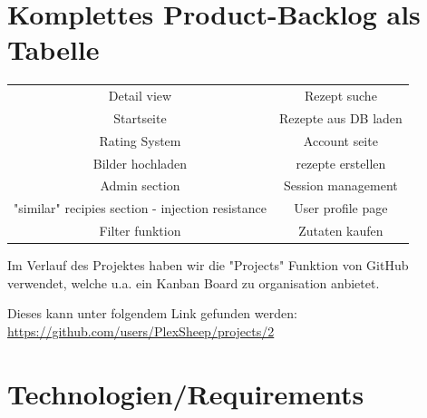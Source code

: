\documentclass{article}
\begin{document}
\pagebreak
\section{Komplettes Product-Backlog als Tabelle}
\begin{multicols}{2}
\centering
\begin{tabular}{|c|c|}
    Detail view & Rezept suche \\
    Startseite & Rezepte aus DB laden\\
    Rating System & Account seite\\
    Bilder hochladen & rezepte erstellen\\
    Admin section & Session management \\
    "similar" recipies section - injection resistance & User profile page\\
    Filter funktion & Zutaten kaufen\\
\end{tabular}
\end{multicols}

Im Verlauf des Projektes haben wir die "Projects" Funktion von GitHub verwendet, welche u.a. ein Kanban Board zu organisation anbietet.
\begin{center}
    Dieses kann unter folgendem Link gefunden werden:  
    \url{https://github.com/users/PlexSheep/projects/2}
\end{center}


\pagebreak
\section{Technologien/Requirements}
\end{document}
